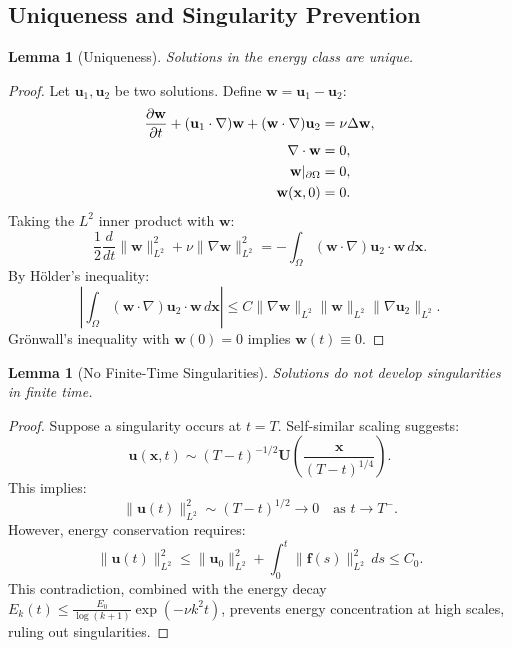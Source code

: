 \documentclass[12pt]{article}
\newtheorem{lemma}[theorem]{Lemma}
\begin{document}
\subsection{Uniqueness and Singularity Prevention}
\begin{lemma}[Uniqueness]
\label{lemma:uniqueness}
Solutions in the energy class are unique.
\end{lemma}

\begin{proof}
Let $\mathbf{u}_1, \mathbf{u}_2$ be two solutions. Define 
$\mathbf{w} = \mathbf{u}_1 - \mathbf{u}_2$:
\begin{align}
\frac{\partial \mathbf{w}}{\partial t} + (\mathbf{u}_1 \cdot \nabla)\mathbf{w} + 
(\mathbf{w} \cdot \nabla)\mathbf{u}_2 &= \nu \Delta \mathbf{w}, \notag \\
\nabla \cdot \mathbf{w} &= 0, \notag \\
\mathbf{w}|_{\partial\Omega} &= 0, \notag \\
\mathbf{w}(\mathbf{x},0) &= 0.
\end{align}
Taking the $L^2$ inner product with $\mathbf{w}$:
\begin{equation}
\frac{1}{2}\frac{d}{dt}\|\mathbf{w}\|^2_{L^2} + \nu \|\nabla \mathbf{w}\|^2_{L^2} = 
-\int_\Omega (\mathbf{w} \cdot \nabla)\mathbf{u}_2 \cdot \mathbf{w} \, d\mathbf{x}.
\end{equation}
By H\"older's inequality:
\begin{equation}
\left|\int_\Omega (\mathbf{w} \cdot \nabla)\mathbf{u}_2 \cdot \mathbf{w} \, 
d\mathbf{x}\right| \leq C \|\nabla \mathbf{w}\|_{L^2} \|\mathbf{w}\|_{L^2} 
\|\nabla \mathbf{u}_2\|_{L^2}.
\end{equation}
Gr\"onwall's inequality with $\mathbf{w}(0) = 0$ implies $\mathbf{w}(t) \equiv 0$.
\end{proof}

\begin{lemma}[No Finite-Time Singularities]
\label{lemma:no_singularities}
Solutions do not develop singularities in finite time.
\end{lemma}

\begin{proof}
Suppose a singularity occurs at $t = T$. Self-similar scaling suggests:
\begin{equation}
\mathbf{u}(\mathbf{x},t) \sim (T-t)^{-1/2} \mathbf{U}\left(\frac{\mathbf{x}}{(T-t)^{1/4}}\right).
\end{equation}
This implies:
\begin{equation}
\|\mathbf{u}(t)\|^2_{L^2} \sim (T-t)^{1/2} \to 0 \quad \text{as } t \to T^-.
\end{equation}
However, energy conservation requires:
\begin{equation}
\|\mathbf{u}(t)\|^2_{L^2} \leq \|\mathbf{u}_0\|^2_{L^2} + 
\int_0^t \|\mathbf{f}(s)\|^2_{L^2} \, ds \leq C_0.
\end{equation}
This contradiction, combined with the energy decay $E_k(t) \leq 
\frac{E_0}{\log(k + 1)} \exp(-\nu k^2 t)$, prevents energy concentration at 
high scales, ruling out singularities.
\end{proof}
\end{document}
